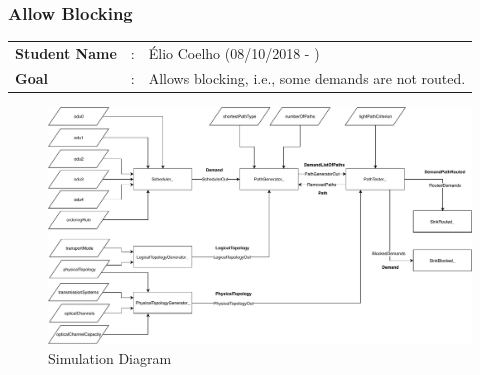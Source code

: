 \subsubsection{Allow Blocking}

\begin{tcolorbox}	
	\begin{tabular}{p{2.75cm} p{0.2cm} p{10.5cm}} 	
		\textbf{Student Name}   &:& \'Elio Coelho    (08/10/2018 - )\\
		\textbf{Goal}           &:& Allows blocking, i.e., some demands are not routed.
	\end{tabular}
\end{tcolorbox}

\vspace{13pt}

\begin{figure}[H]
	\centering
	\includegraphics[width=16cm]{sdf/heuristic/opaque/figures/fluxogram_Opaque}
	\caption{Simulation Diagram}
	\label{fluxogram_opaque}
\end{figure}


